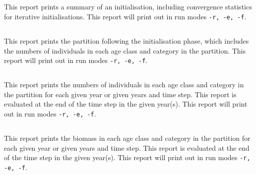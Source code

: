 \subsection{}\label{sec:Report-Initialisation}

This report prints a summary of an initialisation, including convergence statistics for iterative initialisations.  This report will print out in run modes \texttt{-r, -e, -f}.

\subsection{}\label{sec:Report-InitialisationPartition}

This report prints the partition following the initialisation phase, which includes the numbers of individuals in each age class and category in the partition. This report will print out in run modes \texttt{-r, -e, -f}.

\subsection{}\label{sec:Report-Partition}

This report prints the numbers of individuals in each age class and category in the partition for each given year or given years and time step. This report is evaluated at the end of the time step in the given year(s). This report will print out in run modes \texttt{-r, -e, -f}.

\subsection{}\label{sec:Report-PartitionBiomass}

This report prints the biomass in each age class and category in the partition for each given year or given years and time step. This report is evaluated at the end of the time step in the given year(s). This report will print out in run modes \texttt{-r, -e, -f}.

\subsection{}\label{sec:Report-Addressable}

